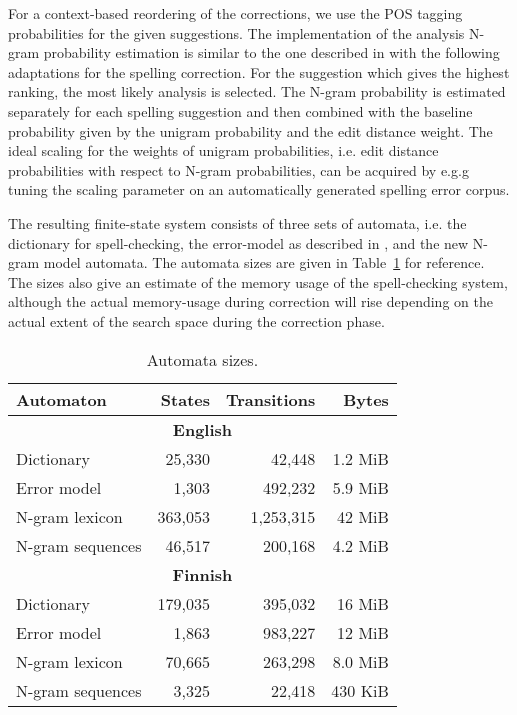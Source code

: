 \documentclass{llncs}
\begin{document}
For a context-based reordering of the corrections, we use the POS tagging
probabilities for the given suggestions. The implementation of the analysis
N-gram probability estimation is similar to the one described in
\cite{silfverberg/2011} with the following adaptations for the spelling
correction. For the suggestion which gives the highest ranking, the most likely
analysis is selected.  The N-gram probability is estimated separately for each
spelling suggestion and then combined with the baseline probability given by
the unigram probability and the edit distance weight. The ideal scaling for the
weights of unigram probabilities, i.e.  edit distance probabilities with
respect to N-gram probabilities, can be acquired by e.g.g tuning the scaling
parameter on an automatically generated spelling error corpus.


The resulting finite-state system consists of three sets of automata, i.e. the
dictionary for spell-checking, the error-model as described in
\cite{pirinen/2010/lrec}, and the new N-gram model automata. The automata sizes
are given in Table~\ref{table:sizes} for reference. The sizes also give an
estimate of the memory usage of the spell-checking system, although the actual
memory-usage during correction will rise depending on the actual extent of the
search space during the correction phase.

\begin{table}
\caption{Automata sizes\label{table:sizes}.}
\begin{center}
\begin{tabular}{lrrr}
    Automaton & States & Transitions & Bytes \\
    \hline
    \multicolumn{4}{c}{\textbf{English}} \\
    \hline
    Dictionary & 25,330 & 42,448 & 1.2 MiB \\
    Error model & 1,303 & 492,232 & 5.9 MiB \\
    N-gram lexicon & 363,053 & 1,253,315 & 42 MiB \\
    N-gram sequences & 46,517 & 200,168 & 4.2 MiB \\
    \hline
    \multicolumn{4}{c}{\textbf{Finnish}} \\
    \hline
    Dictionary & 179,035 & 395,032 & 16 MiB \\
    Error model & 1,863 & 983,227 & 12 MiB \\
    N-gram lexicon & 70,665 & 263,298 & 8.0 MiB \\
    N-gram sequences & 3,325 & 22,418 & 430 KiB \\
    \hline
\end{tabular}
\end{center}
\end{table}
\end{document}
